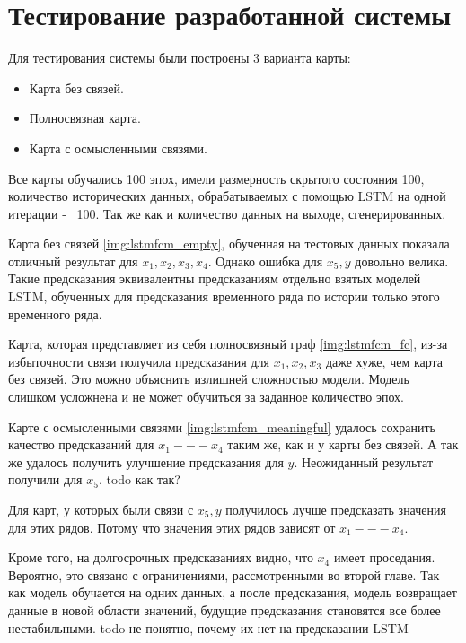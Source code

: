 \section{Тестирование разработанной системы}

Для тестирования системы были построены 3 варианта карты:
\begin{itemize}
	\item Карта без связей.
	\item Полносвязная карта.
	\item Карта с осмысленными связями.
\end{itemize}


Все карты обучались 100 эпох, имели размерность скрытого состояния 100,
количество исторических данных, обрабатываемых с помощью LSTM на одной итерации -~ 100.
Так же как и количество данных на выходе, сгенерированных.


Карта без связей \ref{img:lstmfcm_empty}, обученная на тестовых данных
показала отличный результат для $ x_1, x_2, x_3, x_4  $. Однако ошибка
для $ x_5, y $ довольно велика. Такие предсказания эквивалентны предсказаниям
отдельно взятых моделей LSTM, обученных для предсказания временного ряда
по истории только этого временного ряда.

Карта, которая представляет из себя полносвязный граф \ref{img:lstmfcm_fc},
из-за избыточности связи получила предсказания для $ x_1, x_2, x_3 $ даже
хуже, чем карта без связей. Это можно объяснить излишней сложностью модели.
Модель слишком усложнена и не может обучиться за заданное количество эпох.

Карте с осмысленными связями \ref{img:lstmfcm_meaningful} удалось сохранить качество
предсказаний для $ x_1 --- x_4 $ таким же, как и у карты без связей.
А так же удалось получить улучшение предсказания для $ y $.
Неожиданный результат получили для $ x_5 $. todo как так?

Для карт, у которых были связи с $ x_5, y $ получилось лучше предсказать значения
для этих рядов. Потому что значения этих рядов зависят от $ x_1 --- x_4 $.

Кроме того, на долгосрочных предсказаниях видно, что $ x_4 $ имеет проседания.
Вероятно, это связано с ограничениями, рассмотренными во второй главе.
Так как модель обучается на одних данных, а после предсказания, модель возвращает
данные в новой области значений, будущие предсказания становятся все более нестабильными.
todo не понятно, почему их нет на предсказании LSTM

